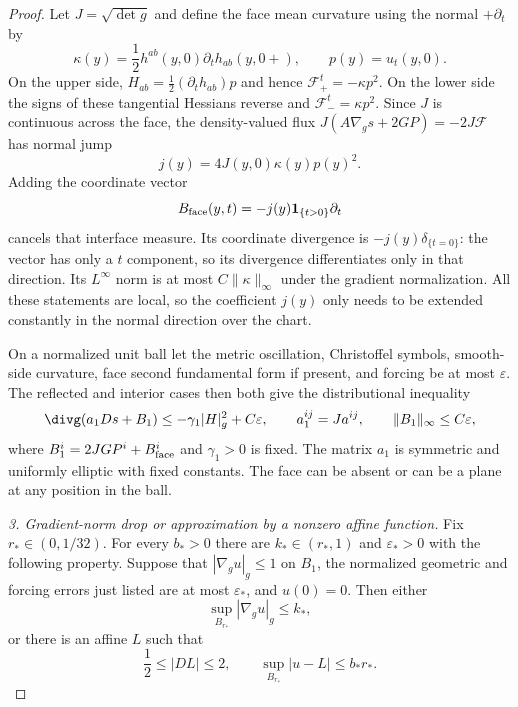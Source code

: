 \begin{proof}
Let $J=\sqrt{\det g}$ and define the face mean curvature using the normal
$+\partial_t$ by
\[
 \kappa(y)=\frac12 h^{ab}(y,0)\partial_t h_{ab}(y,0+),
 \qquad p(y)=u_t(y,0).
\]
On the upper side, $H_{ab}=\tfrac12(\partial_t h_{ab})p$ and hence
$\mathcal F^t_+=-\kappa p^2$.  On the lower side the signs of these
tangential Hessians reverse and $\mathcal F^t_- =\kappa p^2$.
Since $J$ is continuous across the face, the density-valued flux
$J(A\nabla_gs+2GP)=-2J\mathcal F$ has normal jump
\[
 j(y)=4J(y,0)\kappa(y)p(y)^2.
\]
Adding the coordinate vector
\begin{equation}
 B_{\rm face}(y,t)=-j(y)\mathbf1_{\{t>0\}}\partial_t
 \label{eq:elliptic:face-step}
\end{equation}
cancels that interface measure.  Its coordinate divergence is
$-j(y)\delta_{\{t=0\}}$: the vector has only a $t$ component, so
its divergence differentiates only in that direction.  Its $L^\infty$ norm is
at most $C\|\kappa\|_\infty$ under the gradient normalization.
All these statements are local, so the coefficient $j(y)$ only needs
to be extended constantly in the normal direction over the chart.

On a normalized unit ball let the metric oscillation, Christoffel symbols,
smooth-side curvature, face second fundamental form if present, and
forcing be at most $\varepsilon$.  The reflected and interior cases
then both give the distributional inequality
\begin{equation}
 \divg(a_1Ds+B_1)
       \leq-\gamma_1|H|_g^2+C\varepsilon,
 \qquad
 a_1^{ij}=Ja^{ij},\qquad
 \|B_1\|_\infty\leq C\varepsilon,
 \label{eq:elliptic:deficit-coordinate}
\end{equation}
where $B_1^i=2JG P^i+B_{\rm face}^i$ and $\gamma_1>0$ is fixed.
The matrix $a_1$ is symmetric and uniformly elliptic with fixed constants.
The face can be absent or can be a plane at any position in the ball.

\medskip\noindent
\emph{3. Gradient-norm drop or approximation by a nonzero affine function.}
Fix $r_*\in(0,1/32)$.  For every $b_*>0$ there are
$k_*\in(r_*,1)$ and $\varepsilon_*>0$ with the following property.
Suppose that $|\nabla_g u|_g\leq1$ on $B_1$, the normalized geometric
and forcing errors just listed are at most $\varepsilon_*$, and
$u(0)=0$.  Then either
\begin{equation}
 \sup_{B_{r_*}}|\nabla_g u|_g\leq k_*,
 \label{eq:elliptic:norm-drop}
\end{equation}
or there is an affine $L$ such that
\begin{equation}
 \frac12\leq|DL|\leq2,\qquad
 \sup_{B_{r_*}}|u-L|\leq b_*r_*.
 \label{eq:elliptic:affine-entry}
\end{equation}


\end{proof}
